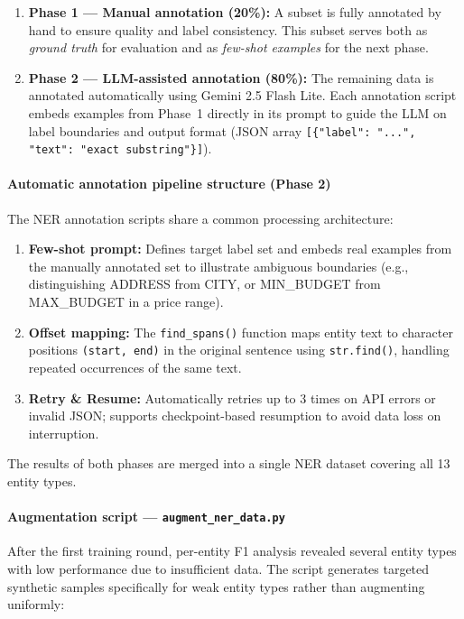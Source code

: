 \documentclass[12pt, a4paper]{report}
\begin{document}
\begin{enumerate}
  \item \textbf{Phase 1 --- Manual annotation (20\%):}
        A subset is fully annotated by hand to ensure quality and label consistency.
        This subset serves both as \textit{ground truth} for evaluation
        and as \textit{few-shot examples} for the next phase.

  \item \textbf{Phase 2 --- LLM-assisted annotation (80\%):}
        The remaining data is annotated automatically using Gemini 2.5 Flash Lite.
        Each annotation script embeds examples from Phase~1 directly in its prompt
        to guide the LLM on label boundaries and output format
        (JSON array \texttt{[\{"label": "...", "text": "exact substring"\}]}).
\end{enumerate}

\paragraph{Automatic annotation pipeline structure (Phase 2)}
The NER annotation scripts share a common processing architecture:

\begin{enumerate}
  \item \textbf{Few-shot prompt:} Defines target label set and embeds real examples
        from the manually annotated set to illustrate ambiguous boundaries
        (e.g., distinguishing ADDRESS from CITY,
        or MIN\_BUDGET from MAX\_BUDGET in a price range).
  \item \textbf{Offset mapping:} The \texttt{find\_spans()} function maps
        entity text to character positions \texttt{(start, end)} in the original sentence
        using \texttt{str.find()}, handling repeated occurrences of the same text.
  \item \textbf{Retry \& Resume:} Automatically retries up to 3 times on API errors
        or invalid JSON; supports checkpoint-based resumption to avoid data loss on interruption.
\end{enumerate}

The results of both phases are merged into a single NER dataset
covering all 13 entity types.

\paragraph{Augmentation script --- \texttt{augment\_ner\_data.py}}
After the first training round, per-entity F1 analysis revealed several entity types
with low performance due to insufficient data.
The script generates targeted synthetic samples specifically for weak entity types
rather than augmenting uniformly:
\end{document}
